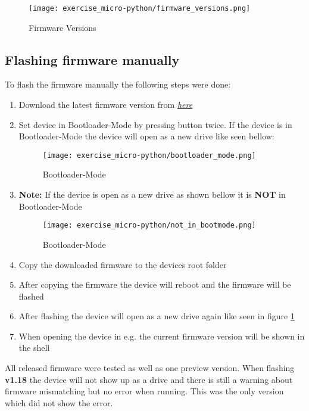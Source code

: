 \begin{figure}[H]
  \centering
  \texttt{[image: exercise\_micro-python/firmware\_versions.png]}
  \caption{Firmware Versions}
\end{figure}

\subsection{Flashing firmware manually}

To flash the firmware manually the following steps were done:
\begin{enumerate}
  \item Download the latest firmware version from \href{https://micropython.org/download/ARDUINO_NANO_RP2040_CONNECT/}{\textit{here}}
  \item Set device in Bootloader-Mode by pressing  button twice. If the device is in Bootloader-Mode the device will open as a new drive like seen bellow:
        \begin{figure}[H]
          \centering
          \texttt{[image: exercise\_micro-python/bootloader\_mode.png]}
          \caption{Bootloader-Mode}
        \end{figure}
  \item \textbf{Note: } If the device is open as a new drive as shown bellow it is \textbf{NOT} in Bootloader-Mode
        \begin{figure}[H]
          \centering
          \texttt{[image: exercise\_micro-python/not\_in\_bootmode.png]}
          \caption{Bootloader-Mode}
          \label{fig:no_bootloader_mode}
        \end{figure}
  \item Copy the downloaded firmware to the devices root folder
  \item After copying the firmware the device will reboot and the firmware will be flashed
  \item After flashing the device will open as a new drive again like seen in figure \ref{fig:no_bootloader_mode}
  \item When opening the device in e.g.  the current firmware version will be shown in the shell
\end{enumerate}

All released firmware were tested as well as one preview version.
When flashing \textbf{v1.18} the device will not show up as a drive and there is still a warning about 
firmware mismatching but no error when running. This was the only version which did not show the error.

